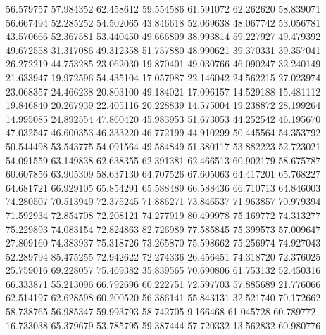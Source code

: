 56.579757
57.984352
62.458612
59.554586
61.591072
62.262620
58.839071
56.667494
52.285252
54.502065
43.846618
52.069638
48.067742
53.056781
43.570666
52.367581
53.440450
49.666809
38.993814
59.227927
49.479392
49.672558
31.317086
49.312358
51.757880
48.990621
39.370331
39.357041
26.272219
44.753285
23.062030
19.870401
49.030766
46.090247
32.240149
21.633947
19.972596
54.435104
17.057987
22.146042
24.562215
27.023974
23.068357
24.466238
20.803100
49.184021
17.096157
14.529188
15.481112
19.846840
20.267939
22.405116
20.228839
14.575004
19.238872
28.199264
14.995085
24.892554
47.860420
45.983953
51.673053
44.252542
46.195670
47.032547
46.600353
46.333220
46.772199
44.910299
50.445564
54.353792
50.544498
53.543775
54.091564
49.584849
51.380117
53.882223
52.723021
54.091559
63.149838
62.638355
62.391381
62.466513
60.902179
58.675787
60.607856
63.905309
58.637130
64.707526
67.605063
64.417201
65.768227
64.681721
66.929105
65.854291
65.588489
66.588436
66.710713
64.846003
74.280507
70.513949
72.375245
71.886271
73.846537
71.963857
70.979394
71.592934
72.854708
72.208121
74.277919
80.499978
75.169772
74.313277
75.229893
74.083154
72.824863
82.726989
77.585845
75.399573
57.009647
27.809160
74.383937
75.318726
73.265870
75.598662
75.256974
74.927043
52.289794
85.475255
72.942622
72.274336
26.456451
74.318720
72.376025
25.759016
69.228057
75.469382
35.839565
70.690806
61.753132
52.450316
66.333871
55.213096
66.792696
60.222751
72.597703
57.885689
21.776066
62.514197
62.628598
60.200520
56.386141
55.843131
32.521740
70.172662
58.738765
56.985347
59.993793
58.742705
9.166468
61.045728
60.789772
16.733038
65.379679
53.785795
59.387444
57.720332
13.562832
60.980776
